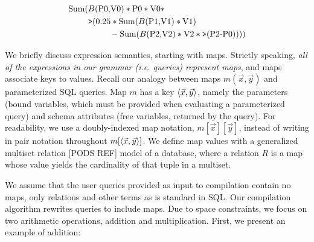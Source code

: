 {

\vspace{-3mm}
\begin{align*}
\mbox{Sum}(
& B(\mbox{P0,V0}) * \mbox{P0} * \mbox{V0} *\\
& \mbox{{\tt >}}(0.25 * \mbox{Sum}(B(\mbox{P1,V1}) * \mbox{V1}) \\
& \qquad \; \; - \mbox{Sum}(B(\mbox{P2,V2}) * \mbox{V2} * \mbox{{\tt >}}(\mbox{P2-P0}))))
\end{align*}

We briefly discuss expression semantics, starting with maps. Strictly speaking,
\textit{all of the expressions in our grammar (i.e. queries) represent maps},
and maps associate keys to values. Recall our analogy between maps
$m(\vec{x},\vec{y})$ and parameterized SQL queries. Map $m$ has a key
${\langle\vec{x},\vec{y}\rangle}$, namely the parameters (bound variables, which must be
provided when evaluating a parameterized query) and schema attributes (free
variables, returned by the query). For readability, we use a doubly-indexed map
notation, $m[\vec{x}][\vec{y}]$, instead of writing in pair notation throughout
$m[{\langle\vec{x}, \vec{y}\rangle}]$. We define map values with a generalized multiset
relation [PODS REF] model of a database, where a relation $R$ is a map whose
value yields the cardinality of that tuple in a multiset.

We assume that the user queries provided as input to compilation contain no
maps, only relations and other terms as is standard in SQL. Our compilation
algorithm rewrites queries to include maps. Due to space constraints, we focus
on two arithmetic operations, addition and multiplication. First, we present an
example of addition:

}
